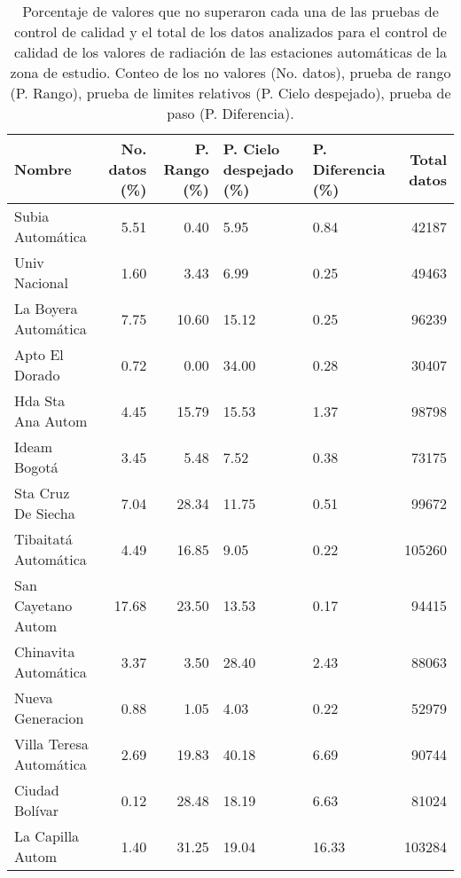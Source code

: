 \begin{table}[H]
\begin{center}

\caption{Porcentaje de valores que no superaron cada una de las pruebas de control de calidad y el total de los datos analizados para el control de calidad de los valores de radiación de las estaciones automáticas de la zona de estudio. Conteo de los no valores (No. datos), prueba de rango (P. Rango), prueba de limites relativos (P. Cielo despejado), prueba de paso (P. Diferencia).}
\begin{tabular}{p{3cm}rrp{3cm}p{3cm}r}
\toprule
      Nombre &  No. datos (\%) &  P. Rango (\%) &  P. Cielo despejado (\%) &  P. Diferencia (\%) & Total datos \\
\midrule
         Subia Automática &       5.51 &      0.40 &                5.95 &           0.84 &         42187 \\
           Univ Nacional &       1.60 &      3.43 &                6.99 &           0.25 &         49463 \\
    La Boyera Automática &       7.75 &     10.60 &               15.12 &           0.25 &         96239 \\
          Apto El Dorado &       0.72 &      0.00 &               34.00 &           0.28 &         30407 \\
       Hda Sta Ana Autom &       4.45 &     15.79 &               15.53 &           1.37 &         98798 \\
            Ideam Bogotá &       3.45 &      5.48 &                7.52 &           0.38 &         73175 \\
      Sta Cruz De Siecha &       7.04 &     28.34 &               11.75 &           0.51 &         99672 \\
    Tibaitatá Automática &       4.49 &     16.85 &                9.05 &           0.22 &        105260 \\
      San Cayetano Autom &      17.68 &     23.50 &               13.53 &           0.17 &         94415 \\
    Chinavita Automática &       3.37 &      3.50 &               28.40 &           2.43 &         88063 \\
        Nueva Generacion &       0.88 &      1.05 &                4.03 &           0.22 &         52979 \\
 Villa Teresa Automática &       2.69 &     19.83 &               40.18 &           6.69 &         90744 \\
          Ciudad Bolívar &       0.12 &     28.48 &               18.19 &           6.63 &         81024 \\
        La Capilla Autom &       1.40 &     31.25 &               19.04 &          16.33 &        103284 \\
\bottomrule
\end{tabular}		
		\label{tabla:val_radiacion}
\end{center}
\end{table}

